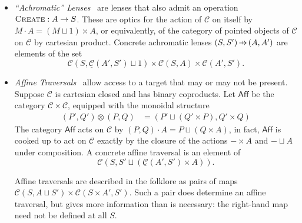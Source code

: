 \documentclass[11pt,letterpaper]{article}
\theoremstyle{plain}
\theoremstyle{definition}
\newcommand{\C}{\mathscr{C}}
\newcommand{\homC}{\underline{\C}}
\newcommand{\Optic}{\mathbf{Optic}}
\newcommand{\act}{\cdot}
\newcommand{\fcreate}{\textsc{Create}}
\newcommand{\hto}{\ensuremath{\,\mathaccent\shortmid\rightarrow\,}}
\begin{document}
\begin{itemize}
\item \emph{``Achromatic'' Lenses}~\cite[Section 5.2]{ProfunctorOpticsThesis} are lenses that also admit an operation $\fcreate : A \to S$. These are optics for the action of $\C$ on itself by $M \act A = (M \sqcup 1) \times A$, or equivalently, of the category of pointed objects of $\C$ on $\C$ by cartesian product. Concrete achromatic lenses $(S, S') \hto (A, A')$ are elements of the set \[\C(S, \homC(A', S') \sqcup 1) \times \C(S, A) \times \C(A', S').\]
\item \emph{Affine Traversals}~\cite{AffineTraversalPost} allow access to a target that may or may not be present. Suppose $\C$ is cartesian closed and has binary coproducts. Let $\mathsf{Aff}$ be the category $\C \times \C$, equipped with the monoidal structure
\begin{align*}
  (P', Q') \otimes (P, Q) &= (P' \sqcup (Q' \times P) , Q' \times Q)
\end{align*}
The category $\mathsf{Aff}$ acts on $\C$ by $(P, Q) \act A = P \sqcup (Q \times A)$, in fact, $\mathsf{Aff}$ is cooked up to act on $\C$ exactly by the closure of the actions $- \times A$ and $- \sqcup A$ under composition. A concrete affine traversal is an element of \[\C(S, S' \sqcup (\homC(A', S') \times A)).\]

Affine traversals are described in the folklore as pairs of maps $\C(S, A \sqcup S') \times \C(S\times A', S')$. Such a pair does determine an affine traversal, but gives more information than is necessary: the right-hand map need not be defined at all $S$.


\end{itemize}
\end{document}
